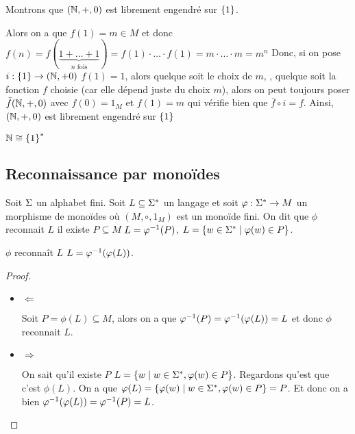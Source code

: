 \begin{exemple}
Montrons que $(\mathbb{N}, + , 0)$ est librement engendré sur $\left\{1\right\}$.


	Alors on a que $f(1) = m \in M$ et donc $f(n) =  f(\underbrace{1+\ldots+1}_{n \text{ fois}}) = f(1)\cdot \ldots \cdot f(1) = m\cdot \ldots \cdot m = m^n$
    Donc, si on pose $i: \left\{1\right\} \to (\mathbb{N}, + 0)$ \tq $f(1) = 1$, alors quelque soit le choix de $m$, \ie, quelque soit la fonction $f$ choisie (car elle dépend juste du choix $m$), alors 
    on peut toujours poser $\bar f (\mathbb{N}, +, 0)$ avec $f(0) = 1_M$ et $f(1) = m$ qui vérifie bien que $\bar f \circ i = f$. Ainsi, $(\mathbb{N}, +, 0)$ est librement engendré sur $\left\{1\right\}$
\end{exemple}

\begin{remarque}
	$\mathbb{N} \cong \left\{1\right\}^*$
\end{remarque}

\subsection{Reconnaissance par monoïdes}

\begin{definition}
	Soit $\Sigma$ un alphabet fini. Soit $L \subseteq \Sigma^{*}$ un langage et soit $\varphi : \Sigma^{*} \to M$ un morphisme de monoïdes où $(M, \circ, 1_M)$ est un monoïde fini. On dit que
	$\phi$ reconnait $L$ \ssi il existe $P \subseteq M$ \tq $L = \varphi^{-1} (P)$, \cad $L = \left\{w \in \Sigma^{*} \mid \varphi (w) \in P\right\}$.
\end{definition}

\begin{exercice}
	$\phi$ reconnaît $L$ \ssi $L = \varphi^{-1} (\varphi (L))$.
\end{exercice}

\begin{proof}
    \begin{itemize}
        \item $\Leftarrow$

            Soit $P = \phi(L) \subseteq M$, alors on a que $\varphi^{-1} (P) = \varphi^{-1} (\varphi (L)) = L$ et donc $\phi$ reconnait $L$.

        \item $\Rightarrow$

            On sait qu'il existe $P$ \tq $L = \left\{w \mid w \in \Sigma^{*}, \varphi(w) \in P\right\}$. Regardons qu'est que c'est $\phi (L)$.
            On a que $\varphi (L) = \left\{\varphi (w) \mid w \in \Sigma^{*}, \varphi(w) \in P\right\} = P$. Et donc on a bien $\varphi^{-1} (\varphi (L)) = \varphi^{-1} (P) = L$.
    \end{itemize}
\end{proof}

